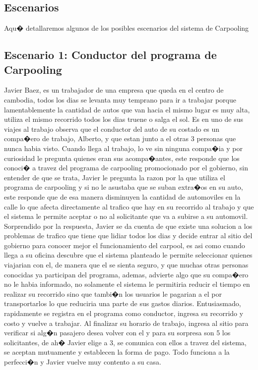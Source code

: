 \documentclass[a4paper,titlepage,10pt]{article}
\begin{document}
\begin{itemize}
\newpage

\section{Escenarios} %
Aqu� detallaremos algunos de los posibles escenarios del sistema de Carpooling

\subsection{Escenario 1: Conductor del programa de Carpooling}
Javier Baez, es un trabajador de una empresa que queda en el centro de cambodia, todos los dias se levanta muy temprano para ir a trabajar
porque lamentablemente la cantidad de autos que van hacia el mismo lugar es muy alta, utiliza el mismo recorrido todos los dias truene o salga el sol.
Es en uno de sus viajes al trabajo observa que el conductor del auto de su costado es un compa�ero de trabajo, Alberto, y que estan junto a el otras 3 personas que nunca habia visto.
Cuando llega al trabajo, lo ve sin ninguna compa�ia y por curiosidad le pregunta quienes eran sus acompa�antes, este responde que los conoci� a travez del programa de carpooling promocionado por el gobierno, sin entender de que se trata, Javier le pregunta la razon por la que utiliza el programa de carpooling y si no le asustaba que se suban extra�os en su auto, este responde que de esa manera disminuyen la cantidad de automoviles en la calle lo que afecta directamente al trafico que hay en su recorrido al trabajo y que el sistema le permite aceptar o no al solicitante que va a subirse a su automovil. Sorprendido por la respuesta, Javier se da cuenta de que existe una solucion a los problemas de trafico que tiene que lidiar todos los dias y decide entrar al sitio del gobierno para conocer mejor el funcionamiento del carpool, es asi como cuando llega a su oficina descubre que el sistema planteado le permite seleccionar quienes viajarian con el, de manera que el se sienta seguro, y que muchas otras personas conocidas ya participan del programa, ademas, advierte algo que su compa�ero no le habia informado, no solamente el sistema le permitiria reducir el tiempo en realizar su recorrido sino que tambi�n los usuarios le pagarian a el por transportarlos lo que reduciria una parte de sus gastos diarios. Entusiasmado, rapidamente se registra en el programa como conductor, ingresa su recorrido y costo y vuelve a trabajar. Al finalizar su horario de trabajo, ingresa al sitio para verificar si alg�n pasajero desea volver con el y para su sorpresa son 5 los solicitantes, de ah� Javier elige a 3, se comunica con ellos a travez del sistema, se aceptan mutuamente y establecen la forma de pago. Todo funciona a la perfecci�n y Javier vuelve muy contento a su casa.


\end{itemize}
\end{document}
